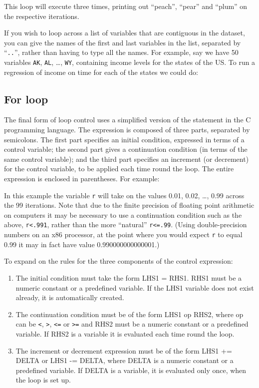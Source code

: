 This loop will execute three times, printing out ``peach'', ``pear''
and ``plum'' on the respective iterations.  

If you wish to loop across a list of variables that are contiguous in
the dataset, you can give the names of the first and last variables in
the list, separated by ``\verb+..+'', rather than having to type all
the names.  For example, say we have 50 variables \verb+AK+,
\verb+AL+, \dots{}, \verb+WY+, containing income levels for the states
of the US.  To run a regression of income on time for each of the
states we could do:



\subsection{For loop}
\label{loop-for}

The final form of loop control uses a simplified version of the
 statement in the C programming language.  The expression is
composed of three parts, separated by semicolons.  The first part
specifies an initial condition, expressed in terms of a control
variable; the second part gives a continuation condition (in terms of
the same control variable); and the third part specifies an increment
(or decrement) for the control variable, to be applied each time round
the loop.  The entire expression is enclosed in parentheses.  For
example:


In this example the variable \verb+r+ will take on the values 0.01,
0.02, \dots{}, 0.99 across the 99 iterations.  Note that due to the
finite precision of floating point arithmetic on computers it may be
necessary to use a continuation condition such as the above,
\verb+r<.991+, rather than the more ``natural'' \verb+r<=.99+.  (Using
double-precision numbers on an x86 processor, at the point where you
would expect \verb+r+ to equal 0.99 it may in fact have value
0.990000000000001.)

To expand on the rules for the three components of the control
expression:

\begin{enumerate}
\item The initial condition must take the form LHS1 = RHS1.  RHS1 must
  be a numeric constant or a predefined variable.  If the LHS1
  variable does not exist already, it is automatically created.
\item The continuation condition must be of the form LHS1 op RHS2,
  where op can be \verb+<+, \verb+>+, \verb+<=+ or \verb+>=+ and RHS2
  must be a numeric constant or a predefined variable.  If RHS2 is a
  variable it is evaluated each time round the loop.
\item The increment or decrement expression must be of the form LHS1
  += DELTA or LHS1 -= DELTA, where DELTA is a numeric constant or a
  predefined variable.  If DELTA is a variable, it is evaluated only
  once, when the loop is set up.
\end{enumerate}
      

